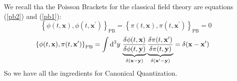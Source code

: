  We recall tha the Poisson Brackets for the classical field theory are equations (\ref{pb2}) and (\ref{pb1}):
\begin{equation}
\left\{\phi(t, \mathbf{x}), \phi\left(t, \mathbf{x}^{\prime}\right)\right\}_{\mathrm{PB}}=\left\{\pi(t, \mathbf{x}), \pi\left(t, \mathbf{x}^{\prime}\right)\right\}_{\mathrm{PB}}=0
\label{pb11}
\end{equation}
\begin{equation}
\begin{aligned}
    \poissonbracket{\phi(t,\vb{x})}{\pi(t,\vb{x}^\prime)}_{\text{PB}}&=\int\dd^3y\,\underbrace{\fdv{\phi(t,\vb{x})}{\phi(t,\vb{y})}}_{\delta(\vb{x}-\vb{y})}\underbrace{\fdv{\pi(t,\vb{x}^\prime)}{\pi(t,\vb{y})}}_{\delta(\vb{x}^\prime-\vb{y})}=\delta(\vb{x}-\vb{x}^\prime)
    \label{pb22}
\end{aligned}
\end{equation}
So we have all the ingredients for Canonical Quantization.
